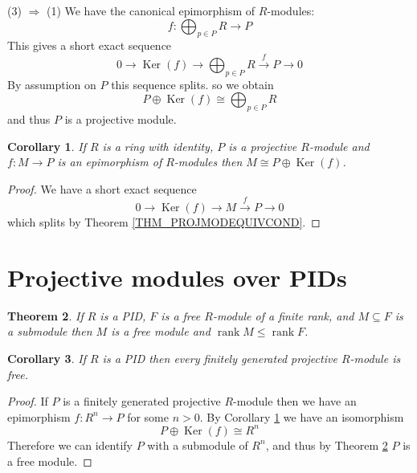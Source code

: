 \documentclass[12pt, letterpaper, oneside]{article}
\theoremstyle{plain}
\newtheorem{theorem}{Theorem}[section]
\newtheorem{corollary}[theorem]{Corollary}
\theoremstyle{definition}
\newcommand{\lra}{\longrightarrow}
\newcommand{\Ker}{\operatorname{Ker}}
\newcommand{\rank}{\operatorname{rank}}
\newcommand{\vs}{\vskip 5mm}
\begin{document}
\vs


(3) $\Rightarrow$ (1) We have the canonical epimorphism of $R$-modules:
$$f\colon \bigoplus_{p\in P} R \to P$$  
This gives a short exact sequence 
$$0 \lra \Ker(f) {\lra} \bigoplus_{p\in P} R \overset{f}{\lra} P \lra 0$$
By assumption on $P$ this sequence splits. so we obtain 
$$P\oplus \Ker(f) \cong \bigoplus_{p\in P} R$$
and thus $P$ is a projective module. 


\vs\vs


\begin{corollary}
\label{COR_PROJEPISPLIT}
If $R$ is a ring with identity, $P$ is a projective $R$-module and $f\colon M \to P$ 
is an epimorphism of $R$-modules then $M \cong P\oplus \Ker(f)$.
\end{corollary}


\vs

\begin{proof}
We have a short exact sequence 
$$0 \lra \Ker(f) {\lra} M \overset{f}{\lra} P \lra 0$$
which splits by Theorem \ref{THM_PROJMODEQUIVCOND}.
\end{proof}







\newpage
\section{Projective modules over PIDs}
\label{SEC_PROJMODOVERPIDS} 


\begin{theorem}
\label{THM_PIDSUBMODOFFREE}
If $R$ is a PID, $F$ is a free $R$-module of a finite rank, and $M\subseteq F$ is 
a submodule  then $M$ is a free module and $\rank M \leq \rank F$.  
\end{theorem}


\vs\vs

\begin{corollary}
\label{COR_PROJPID}
If $R$ is a PID then every finitely generated projective $R$-module is free.
\end{corollary}

\vs

\begin{proof}
If $P$ is a finitely generated projective $R$-module then we have an epimorphism 
$f\colon R^{n} \to P$ for some $n>0$. By Corollary \ref{COR_PROJEPISPLIT} we have an isomorphism
$$P\oplus \Ker(f) \cong R^{n}$$
Therefore we can identify $P$ with a submodule of $R^{n}$, and thus by 
Theorem \ref{THM_PIDSUBMODOFFREE}  $P$ is  a free module. 
\end{proof}
\end{document}

